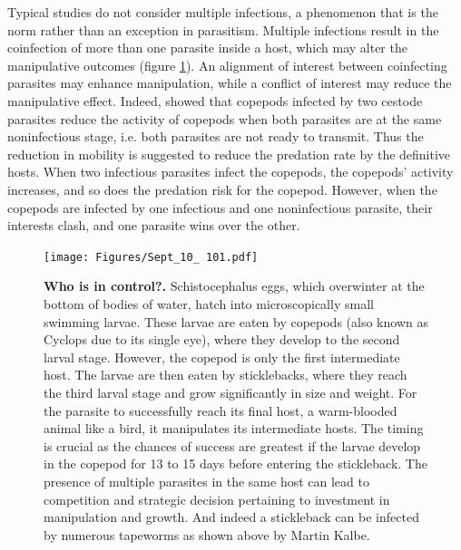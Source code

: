 \documentclass[a4paper]{scrartcl}
\begin{document}
Typical studies do not consider multiple infections, a phenomenon that is the norm rather than an exception in parasitism. 
Multiple infections result in the coinfection of more than one parasite inside a host, which may alter the manipulative outcomes (figure \ref{fig:empirical}). 
An alignment of interest between coinfecting parasites may enhance manipulation, while a conflict of interest may reduce the manipulative effect. 
Indeed, \cite{Hafer:2015gl} showed that copepods infected by two cestode parasites reduce the activity of copepods when both parasites are at the same noninfectious stage, i.e. both parasites are not ready to transmit. 
Thus the reduction in mobility is suggested to reduce the predation rate by the definitive hosts. 
When two infectious parasites infect the copepods, the copepods' activity increases, and so does the predation risk for the copepod. 
However, when the copepods are infected by one infectious and one noninfectious parasite, their interests clash, and one parasite wins over the other. 

\begin{figure}[ht!]
\centering
\texttt{[image: Figures/Sept\_10\_ 101.pdf]}
\caption{\textbf{Who is in control?.}
Schistocephalus eggs, which overwinter at the bottom of bodies of water, hatch into microscopically small swimming larvae. 
These larvae are eaten by copepods (also known as Cyclops due to its single eye), where they develop to the second larval stage. 
However, the copepod is only the first intermediate host. 
The larvae are then eaten by sticklebacks, where they reach the third larval stage and grow significantly in size and weight. 
For the parasite to successfully reach its final host, a warm-blooded animal like a bird, it manipulates its intermediate hosts. 
The timing is crucial as the chances of success are greatest if the larvae develop in the copepod for 13 to 15 days before entering the stickleback. 
The presence of multiple parasites in the same host can lead to competition and strategic decision pertaining to investment in manipulation and growth.
And indeed a stickleback can be infected by numerous tapeworms as shown above by Martin Kalbe.
}
\label{fig:empirical}
\end{figure}
\end{document}
